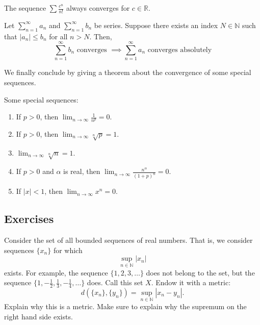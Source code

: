   \begin{example}
    The sequence $\sum \frac{c^n}{n!}$ always converges for $c \in \mathbb{R}$. 
  \end{example}

  \begin{theorem}
    Let $\sum_{n=1}^\infty a_n$ and $\sum_{n=1}^\infty b_n$ be series. Suppose there exists an index $N \in \mathbb{N}$ such that $|a_n| \leq b_n$ for all $n>N$. Then, 
    \begin{equation}
      \sum_{n=1}^\infty b_n \text{ converges } \implies \sum_{n=1}^\infty a_n \text{ converges absolutely}
    \end{equation}
  \end{theorem}

  We finally conclude by giving a theorem about the convergence of some special sequences. 

  \begin{theorem}
    Some special sequences: 
    \begin{enumerate}
      \item If $p > 0$, then $\lim_{n \rightarrow \infty} \frac{1}{n^p} = 0$. 
      
      \item If $p > 0$, then $\lim_{n \rightarrow \infty} \sqrt[n]{p} = 1$. 

      \item $\lim_{n \rightarrow \infty} \sqrt[n]{n} = 1$. 

      \item If $p > 0$ and $\alpha$ is real, then $\lim_{n \rightarrow \infty} \frac{n^\alpha}{(1 + p)^n} = 0$. 
      
      \item If $|x| < 1$, then $\lim_{n \rightarrow \infty} x^n = 0$. 
    \end{enumerate}
  \end{theorem}

\subsection{Exercises}

  \begin{exercise}
    Consider the set of all bounded sequences of real numbers. That is, we
    consider sequences $\{x_n\}$ for which
    \begin{equation}
      \sup_{n\in\mathbb{N}} |x_n|
    \end{equation}
    exists. For example, the sequence $\{1,2,3,\ldots\}$ does not belong to the set,
    but the sequence $\{1,-\frac{1}{2},\frac{1}{3},-\frac{1}{4},\ldots\}$ does. Call this set $X$. Endow it with
    a metric:
    \begin{equation}
      d(\{x_n\},\{y_n\}) = \sup_{n\in\mathbb{N}} |x_n - y_n|.
    \end{equation}
    Explain why this is a metric. Make sure to explain why the supremum on
    the right hand side exists.
  \end{exercise}

